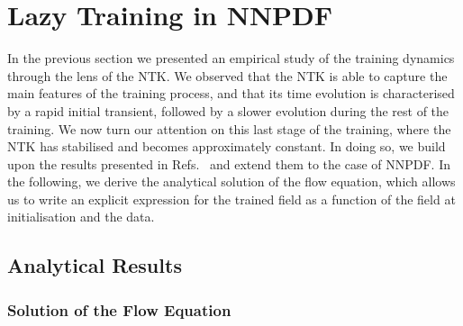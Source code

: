 \section{Lazy Training in NNPDF}
\label{sec:LazyTraining}

In the previous section we presented an empirical study of the training dynamics
through the lens of the NTK. We observed that the NTK is able to capture the
main features of the training process, and that its time evolution is
characterised by a rapid initial transient, followed by a slower evolution
during the rest of the training. We now turn our attention on this last stage of
the training, where the NTK has stabilised and becomes approximately constant.
In doing so, we build upon the results presented in
Refs.~\cite{jacot2018neural,lee2019wide} and extend them to the case of NNPDF.
In the following, we derive the analytical solution of the flow equation, which
allows us to write an explicit expression for the trained field as a function of
the field at initialisation and the data.

\subsection{Analytical Results}
\label{eq:AnlyticalLazySolution}

\subsubsection{Solution of the Flow Equation}
\label{sec:Lazy}

